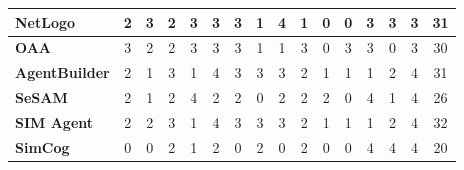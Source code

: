 \begin{table}[htb!]
\begin{tabular}{|l|l|l|l|l|l|l|l|l|l|l|l|l|l|l|l|}
\hline
\textbf{NetLogo} & \multicolumn{1}{c|}{2} & \multicolumn{1}{c|}{3} & \multicolumn{1}{c|}{2} & \multicolumn{1}{c|}{3} & \multicolumn{1}{c|}{3} & \multicolumn{1}{c|}{3} & \multicolumn{1}{c|}{1} & \multicolumn{1}{c|}{4} & \multicolumn{1}{c|}{1} & \multicolumn{1}{c|}{0} & \multicolumn{1}{c|}{0} & \multicolumn{1}{c|}{3} & \multicolumn{1}{c|}{3} & \multicolumn{1}{c|}{3} & \multicolumn{1}{c|}{31} \\ 
\hline
\textbf{OAA} & \multicolumn{1}{c|}{3} & \multicolumn{1}{c|}{2} & \multicolumn{1}{c|}{2} & \multicolumn{1}{c|}{3} & \multicolumn{1}{c|}{3} & \multicolumn{1}{c|}{3} & \multicolumn{1}{c|}{1} & \multicolumn{1}{c|}{1} & \multicolumn{1}{c|}{3} & \multicolumn{1}{c|}{0} & \multicolumn{1}{c|}{3} & \multicolumn{1}{c|}{3} & \multicolumn{1}{c|}{0} & \multicolumn{1}{c|}{3} & \multicolumn{1}{c|}{30} \\ 
\hline
\textbf{AgentBuilder} & \multicolumn{1}{c|}{2} & \multicolumn{1}{c|}{1} & \multicolumn{1}{c|}{3} & \multicolumn{1}{c|}{1} & \multicolumn{1}{c|}{4} & \multicolumn{1}{c|}{3} & \multicolumn{1}{c|}{3} & \multicolumn{1}{c|}{3} & \multicolumn{1}{c|}{2} & \multicolumn{1}{c|}{1} & \multicolumn{1}{c|}{1} & \multicolumn{1}{c|}{1} & \multicolumn{1}{c|}{2} & \multicolumn{1}{c|}{4} & \multicolumn{1}{c|}{31} \\ 
\hline
\textbf{SeSAM} & \multicolumn{1}{c|}{2} & \multicolumn{1}{c|}{1} & \multicolumn{1}{c|}{2} & \multicolumn{1}{c|}{4} & \multicolumn{1}{c|}{2} & \multicolumn{1}{c|}{2} & \multicolumn{1}{c|}{0} & \multicolumn{1}{c|}{2} & \multicolumn{1}{c|}{2} & \multicolumn{1}{c|}{2} & \multicolumn{1}{c|}{0} & \multicolumn{1}{c|}{4} & \multicolumn{1}{c|}{1} & \multicolumn{1}{c|}{4} & \multicolumn{1}{c|}{26} \\ 
\hline
\textbf{SIM Agent} & \multicolumn{1}{c|}{2} & \multicolumn{1}{c|}{2} & \multicolumn{1}{c|}{3} & \multicolumn{1}{c|}{1} & \multicolumn{1}{c|}{4} & \multicolumn{1}{c|}{3} & \multicolumn{1}{c|}{3} & \multicolumn{1}{c|}{3} & \multicolumn{1}{c|}{2} & \multicolumn{1}{c|}{1} & \multicolumn{1}{c|}{1} & \multicolumn{1}{c|}{1} & \multicolumn{1}{c|}{2} & \multicolumn{1}{c|}{4} & \multicolumn{1}{c|}{32} \\ 
\hline
\textbf{SimCog} & \multicolumn{1}{c|}{0} & \multicolumn{1}{c|}{0} & \multicolumn{1}{c|}{2} & \multicolumn{1}{c|}{1} & \multicolumn{1}{c|}{2} & \multicolumn{1}{c|}{0} & \multicolumn{1}{c|}{2} & \multicolumn{1}{c|}{0} & \multicolumn{1}{c|}{2} & \multicolumn{1}{c|}{0} & \multicolumn{1}{c|}{0} & \multicolumn{1}{c|}{4} & \multicolumn{1}{c|}{4} & \multicolumn{1}{c|}{4} & \multicolumn{1}{c|}{20} \\ 

\end{tabular}
\end{table}
